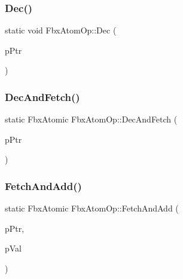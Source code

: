 \mbox{\label{class_fbx_atom_op_a4be312e100244ff3688814e6c2143d29}} 
\subsubsection{\texorpdfstring{Dec()}{Dec()}}
{\footnotesize\ttfamily static void Fbx\+Atom\+Op\+::\+Dec (\begin{DoxyParamCaption}\item[{volatile Fbx\+Atomic $\ast$}]{p\+Ptr }\end{DoxyParamCaption})\hspace{0.3cm}{\ttfamily [static]}}

\mbox{\label{class_fbx_atom_op_a1c5402b4ff3ee7e4bed3662109bcbe31}} 
\subsubsection{\texorpdfstring{Dec\+And\+Fetch()}{DecAndFetch()}}
{\footnotesize\ttfamily static Fbx\+Atomic Fbx\+Atom\+Op\+::\+Dec\+And\+Fetch (\begin{DoxyParamCaption}\item[{volatile Fbx\+Atomic $\ast$}]{p\+Ptr }\end{DoxyParamCaption})\hspace{0.3cm}{\ttfamily [static]}}

\mbox{\label{class_fbx_atom_op_a114fbda18ab3db31fa90d1349a3bc723}} 
\subsubsection{\texorpdfstring{Fetch\+And\+Add()}{FetchAndAdd()}}
{\footnotesize\ttfamily static Fbx\+Atomic Fbx\+Atom\+Op\+::\+Fetch\+And\+Add (\begin{DoxyParamCaption}\item[{volatile Fbx\+Atomic $\ast$}]{p\+Ptr,  }\item[{Fbx\+Atomic}]{p\+Val }\end{DoxyParamCaption})\hspace{0.3cm}{\ttfamily [static]}}

